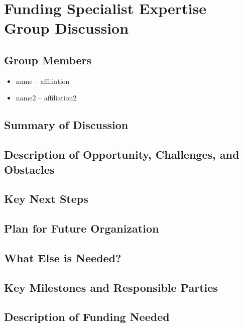 \section{Funding Specialist Expertise Group Discussion}
\label{sec:appendix_funding_spec_expert}


\subsection{Group Members}

\begin{itemize}
\item name -- affiliation
\item name2 -- affiliation2
\end{itemize}

\subsection{Summary of Discussion}

\subsection{Description of Opportunity, Challenges, and Obstacles}


\subsection{Key Next Steps}


\subsection{Plan for Future Organization}


\subsection{What Else is Needed?}


\subsection{Key Milestones and Responsible Parties}


\subsection{Description of Funding Needed}
